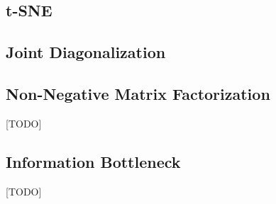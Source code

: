 \documentclass[12pt,a4paper]{article}
\begin{document}
\subsection{t-SNE}
\cite{maaten2008visualizing}


\subsection{Joint Diagonalization}
\cite{JSSv076i02}


\subsection{Non-Negative Matrix Factorization}
\label{sec:matrix_factorization}
[TODO]



\subsection{Information Bottleneck}
[TODO]

%
%
%


\begin{remark}
\end{remark}
\end{document}
